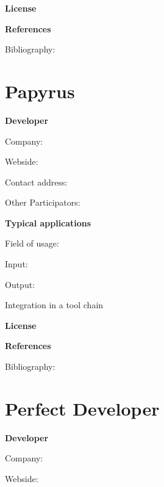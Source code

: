 \documentclass{./template/openetcs2}
\begin{document}


	\textbf{License}


	\textbf{References}

	Bibliography:


\section{Papyrus}

	\textbf{Developer}

	Company: 

	Webside:

	Contact address:

	Other  Participators:



	\textbf{Typical applications}

	Field of usage:


	Input:

	Output:





	Integration in a tool chain



	\textbf{License}


	\textbf{References}

	Bibliography:


\section{Perfect Developer}

	\textbf{Developer}

	Company: 

	Webside:
\end{document}
